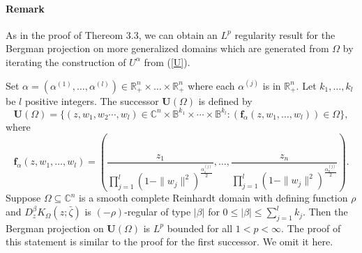 \documentclass[reqno,12pt]{amsart}
\numberwithin{equation}{section}
\begin{document}
{\paragraph{\bf Remark}As in the proof of Thereom 3.3, we can obtain an $L^p$ regularity result for the Bergman projection on more generalized domains which are generated from $\Omega$ by iterating the construction of $U^{\alpha}$ from (\ref{U}).
		
		Set $\alpha=(\alpha^{(1)},\dots,\alpha^{(l)})\in\mathbb R^n_+\times\dots\times\mathbb R^n_+$ where each $\alpha^{(j)}$ is in $\mathbb R^n_+$. Let $k_1,\dots,k_l$ be $l$ positive integers. The successor  $\mathbf U(\Omega)$ is defined by
		\begin{equation}\label{33}
				\mathbf U(\Omega)=\{(z,w_1,w_2\cdots,w_l)\in \mathbb C^n\times\mathbb B^{k_1}\times\cdots\times\mathbb B^{k_l}:(\mathbf f_{\alpha}(z,w_1,\dots,w_l))\in \Omega\},
		\end{equation}
		where 
		\begin{equation}\label{34}
		\mathbf f_{\alpha}\left(z,w_1,\dots,w_l\right)=\left(\frac{z_1}{\prod_{j=1}^{l}(1-\|w_j\|^2)^{\frac{\alpha^{(j)}_1}{2}}},\dots,\frac{z_n}{\prod_{j=1}^{l}(1-\|w_j\|^2)^{\frac{\alpha^{(j)}_n}{2}}}\right).
		\end{equation}
			Suppose $\Omega\subseteq \mathbb C^n$ is a smooth {complete Reinhardt} domain with defining function $\rho$ and  $D^{\beta}_zK_\Omega(z;\bar{\zeta})$ is $(-\rho)$-regular of type $|\beta|$ for $0\leq |\beta|\leq \sum_{j=1}^{l}k_j$.
			Then the Bergman projection on $\mathbf U(\Omega)$ is $L^p$ bounded for all $1< p< \infty$.
		The proof of this statement is similar to the proof for the first successor. We omit it here.}


\end{document}
